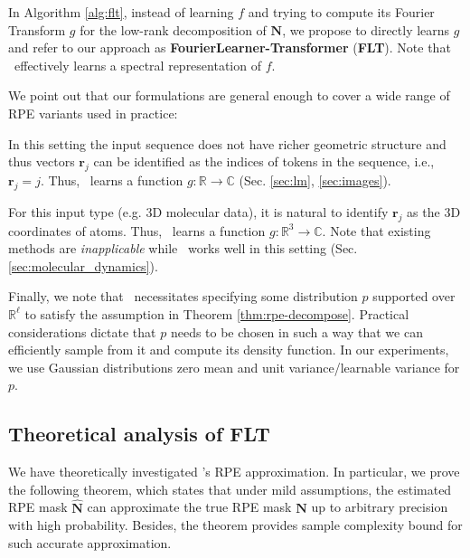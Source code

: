 In Algorithm \ref{alg:flt}, instead of learning $f$ and trying to compute its Fourier Transform $g$ for the low-rank decomposition of $\mathbf{N}$, we propose to directly learns $g$ and refer to our approach as \textbf{FourierLearner-Transformer} (\textbf{FLT}). Note that \FLT~effectively learns a spectral representation of $f$. 

We point out that our formulations are general enough to cover a wide range of RPE variants used in practice:

In this setting the input sequence does not have richer geometric structure and thus vectors $\mathbf{r}_{j}$ can be identified as the indices of tokens in the sequence, i.e., $\mathbf{r}_{j}=j$. Thus, \FLT~learns a function $g:\mathbb{R} \rightarrow \mathbb{C}$ (Sec. \ref{sec:lm}, \ref{sec:images}).

 For this input type (e.g. 3D molecular data), it is natural to identify $\mathbf{r}_{j}$ as the 3D coordinates of atoms. Thus, \FLT~learns a function $g:\mathbb{R}^{3} \rightarrow \mathbb{C}$. Note that existing methods \cite{liutkus, rpe-performers, topmasking} are \textit{inapplicable} while \FLT~works well in this setting (Sec. \ref{sec:molecular_dynamics}).

Finally, we note that \FLT~necessitates specifying some distribution $p$ supported over $\mathbb{R}^{\ell}$ to satisfy the assumption in Theorem \ref{thm:rpe-decompose}.  Practical considerations dictate that $p$ needs to be chosen in such a way that we can efficiently sample from it and compute its density function. In our experiments, we use Gaussian distributions zero mean and unit variance/learnable variance for $p$.

\subsection{Theoretical analysis of FLT}
We have theoretically investigated \FLT 's RPE approximation. In particular, we prove the following theorem, which states that under mild assumptions, the estimated RPE mask $\widehat{\mathbf{N}}$ can approximate the true RPE mask $\mathbf{N}$ up to arbitrary precision with high probability. Besides, the theorem provides sample complexity bound for such accurate approximation.

